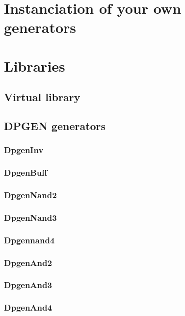 \documentclass[12pt]{article}
\begin{document}
\newpage
\section{Instanciation of your own generators}


\section{Libraries}

    \subsection{Virtual library}
    
    
    \subsection{DPGEN generators}
   
        \subsubsection{DpgenInv} 
        
        \subsubsection{DpgenBuff} 
        
        \subsubsection{DpgenNand2} 
        
        \subsubsection{DpgenNand3} 
        
        \subsubsection{Dpgennand4}
        
        \subsubsection{DpgenAnd2}
        
        \subsubsection{DpgenAnd3} 
        
        \subsubsection{DpgenAnd4} 
        
\end{document}
